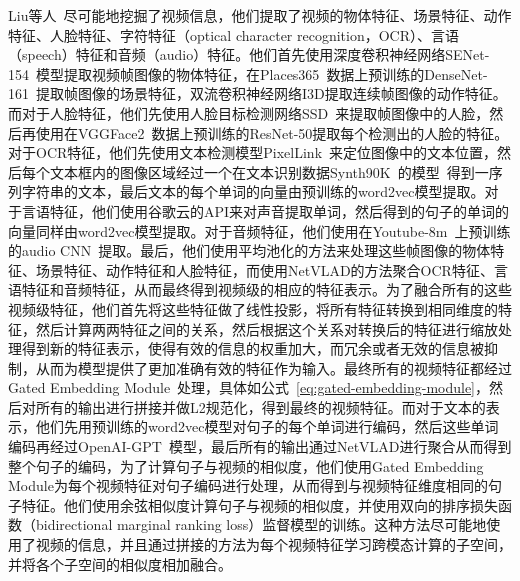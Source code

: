 Liu等人~\cite{liu2019use}尽可能地挖掘了视频信息，他们提取了视频的物体特征、场景特征、动作特征、人脸特征、字符特征（optical character recognition，OCR）、言语（speech）特征和音频（audio）特征。他们首先使用深度卷积神经网络SENet-154~\cite{hu2019squeeze}模型提取视频帧图像的物体特征，在Places365~\cite{zhou2018places}数据上预训练的DenseNet-161~\cite{huang2017densely}提取帧图像的场景特征，双流卷积神经网络I3D提取连续帧图像的动作特征。而对于人脸特征，他们先使用人脸目标检测网络SSD~\cite{liu2016ssd}来提取帧图像中的人脸，然后再使用在VGGFace2~\cite{cao2018vggface2}数据上预训练的ResNet-50提取每个检测出的人脸的特征。对于OCR特征，他们先使用文本检测模型PixelLink~\cite{deng2018pixellink}来定位图像中的文本位置，然后每个文本框内的图像区域经过一个在文本识别数据Synth90K~\cite{liu2018synthetically}的模型~\cite{jakub-mm19}得到一序列字符串的文本，最后文本的每个单词的向量由预训练的word2vec模型提取。对于言语特征，他们使用谷歌云的API来对声音提取单词，然后得到的句子的单词的向量同样由word2vec模型提取。对于音频特征，他们使用在Youtube-8m~\cite{abuelhaija2016youtube}上预训练的audio CNN~\cite{hershey2017cnn}提取。最后，他们使用平均池化的方法来处理这些帧图像的物体特征、场景特征、动作特征和人脸特征，而使用NetVLAD的方法聚合OCR特征、言语特征和音频特征，从而最终得到视频级的相应的特征表示。为了融合所有的这些视频级特征，他们首先将这些特征做了线性投影，将所有特征转换到相同维度的特征，然后计算两两特征之间的关系，然后根据这个关系对转换后的特征进行缩放处理得到新的特征表示，使得有效的信息的权重加大，而冗余或者无效的信息被抑制，从而为模型提供了更加准确有效的特征作为输入。最终所有的视频特征都经过Gated Embedding Module~\cite{miech2018learning}处理，具体如公式~\ref{eq:gated-embedding-module}，然后对所有的输出进行拼接并做L2规范化，得到最终的视频特征。而对于文本的表示，他们先用预训练的word2vec模型对句子的每个单词进行编码，然后这些单词编码再经过OpenAI-GPT~\cite{radford2018improving}模型，最后所有的输出通过NetVLAD进行聚合从而得到整个句子的编码，为了计算句子与视频的相似度，他们使用Gated Embedding Module为每个视频特征对句子编码进行处理，从而得到与视频特征维度相同的句子特征。他们使用余弦相似度计算句子与视频的相似度，并使用双向的排序损失函数（bidirectional marginal ranking loss）监督模型的训练。这种方法尽可能地使用了视频的信息，并且通过拼接的方法为每个视频特征学习跨模态计算的子空间，并将各个子空间的相似度相加融合。

